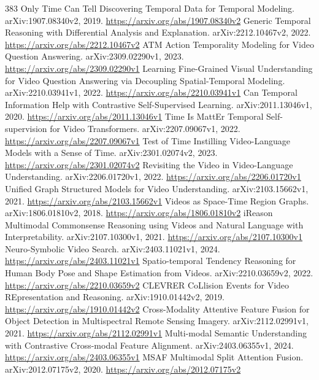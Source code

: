 \documentclass[11pt]{article}
\begin{document}
\begin{thebibliography}{383}
 Only Time Can Tell Discovering Temporal Data for Temporal Modeling. arXiv:1907.08340v2, 2019. \url{https://arxiv.org/abs/1907.08340v2}
 Generic Temporal Reasoning with Differential Analysis and Explanation. arXiv:2212.10467v2, 2022. \url{https://arxiv.org/abs/2212.10467v2}
 ATM Action Temporality Modeling for Video Question Answering. arXiv:2309.02290v1, 2023. \url{https://arxiv.org/abs/2309.02290v1}
 Learning Fine-Grained Visual Understanding for Video Question Answering via Decoupling Spatial-Temporal Modeling. arXiv:2210.03941v1, 2022. \url{https://arxiv.org/abs/2210.03941v1}
 Can Temporal Information Help with Contrastive Self-Supervised Learning. arXiv:2011.13046v1, 2020. \url{https://arxiv.org/abs/2011.13046v1}
 Time Is MattEr Temporal Self-supervision for Video Transformers. arXiv:2207.09067v1, 2022. \url{https://arxiv.org/abs/2207.09067v1}
 Test of Time Instilling Video-Language Models with a Sense of Time. arXiv:2301.02074v2, 2023. \url{https://arxiv.org/abs/2301.02074v2}
 Revisiting the Video in Video-Language Understanding. arXiv:2206.01720v1, 2022. \url{https://arxiv.org/abs/2206.01720v1}
 Unified Graph Structured Models for Video Understanding. arXiv:2103.15662v1, 2021. \url{https://arxiv.org/abs/2103.15662v1}
 Videos as Space-Time Region Graphs. arXiv:1806.01810v2, 2018. \url{https://arxiv.org/abs/1806.01810v2}
 iReason Multimodal Commonsense Reasoning using Videos and Natural Language with Interpretability. arXiv:2107.10300v1, 2021. \url{https://arxiv.org/abs/2107.10300v1}
 Neuro-Symbolic Video Search. arXiv:2403.11021v1, 2024. \url{https://arxiv.org/abs/2403.11021v1}
 Spatio-temporal Tendency Reasoning for Human Body Pose and Shape Estimation from Videos. arXiv:2210.03659v2, 2022. \url{https://arxiv.org/abs/2210.03659v2}
 CLEVRER CoLlision Events for Video REpresentation and Reasoning. arXiv:1910.01442v2, 2019. \url{https://arxiv.org/abs/1910.01442v2}
 Cross-Modality Attentive Feature Fusion for Object Detection in Multispectral Remote Sensing Imagery. arXiv:2112.02991v1, 2021. \url{https://arxiv.org/abs/2112.02991v1}
 Multi-modal Semantic Understanding with Contrastive Cross-modal Feature Alignment. arXiv:2403.06355v1, 2024. \url{https://arxiv.org/abs/2403.06355v1}
 MSAF Multimodal Split Attention Fusion. arXiv:2012.07175v2, 2020. \url{https://arxiv.org/abs/2012.07175v2}

\end{thebibliography}
\end{document}
